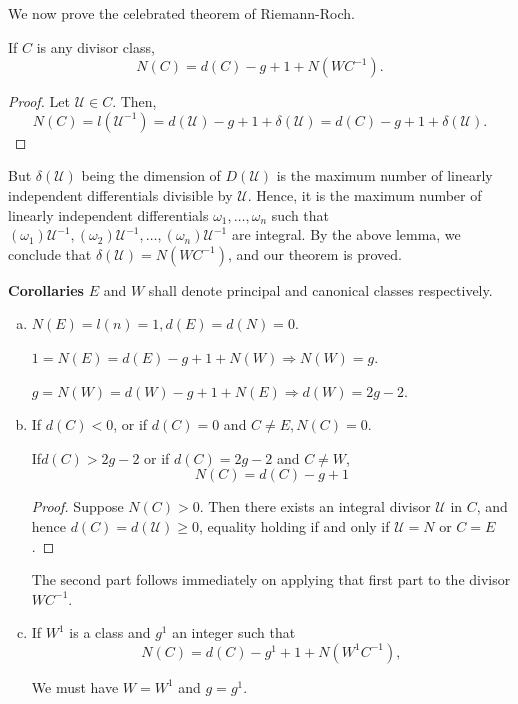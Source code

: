 We now prove the celebrated theorem of Riemann-Roch.
\begin{theorem*}%
  If $C$ is any divisor class,
  $$
  N(C) = d (C) - g + 1 + N (WC^{-1}).
  $$
\end{theorem*}

\begin{proof}
  Let $\mathscr{U} \in C$. Then,
  $$
  N (C) = l(\mathscr{U}^{-1}) = d (\mathscr{U}) - g + 1 + \delta
  (\mathscr{U}) = d(C) - g + 1 + \delta (\mathscr{U}). 
  $$
\end{proof}

But $\delta (\mathscr{U})$ being the dimension of $D(\mathscr{U})$ is
the maximum number of linearly independent differentials divisible by
$\mathscr{U}$. Hence, it is the maximum number of linearly independent
differentials $\omega_1 , \ldots, \omega_n$ such that $(\omega_1)
\mathscr{U}^{-1}, (\omega_2) \mathscr{U}^{-1}, \ldots, (\omega_n)
\mathscr{U}^{-1}$ are integral. By the above lemma, we conclude that
$\delta (\mathscr{U}) = N (WC ^{-1})$, and our theorem is proved. 

\noindent \textbf{Corollaries}
$E$ and $W$ shall denote principal and canonical classes respectively.

\begin{enumerate}[(a)]
\item $N(E) = l (n) = 1, d(E) = d (N) = 0$.

  $1 = N(E) = d (E) - g + 1 + N(W) \Longrightarrow N(W) = g$.
  
  $g = N(W) = d(W) - g +  1 + N(E) \Longrightarrow d(W) = 2g - 2$.

\item If $d (C) < 0$, or if $d (C) = 0$ and $C \neq E, N(C) = 0$.

  If\pageoriginale $d(C) > 2g - 2$ or if $d(C) = 2g - 2$ and $C \neq W$,
  $$
  N(C) = d (C) - g + 1
  $$

  \begin{proof}
    Suppose $N(C) > 0$. Then there exists an integral divisor
    $\mathscr{U}$ in $C$, and hence $d(C) = d (\mathscr{U}) \ge 0$,
    equality holding if and only if $\mathscr{U} = N$ or $C = E$. 
  \end{proof}

  The second part follows immediately on applying that first part to
  the divisor $WC^{-1}$. 
\item If $W^1$ is a class and $g^1$ an integer such that 
  $$
  N(C) = d (C) - g^1 + 1 + N(W^1 C^{-1}),
  $$

  We must have $W = W^1$ and $g=g^1$.
\end{enumerate}

